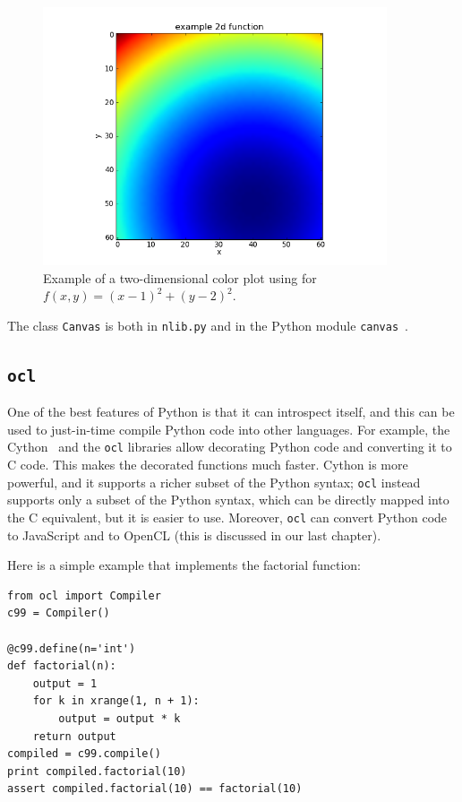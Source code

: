 \documentclass[justified,sixbynine]{tufte-book}
\def\ft{\small\tt}
\theoremstyle{plain}%
\theoremstyle{definition}
\theoremstyle{remark}
\begin{document}
\begin{fullwidth}
\begin{figure}[ht]
\centering\includegraphics[width=4in]{images/color2d.png}
\caption{Example of a two-dimensional color plot using for $f(x,y)=(x-1)^2+(y-2)^2$.}
\end{figure}

The class {\ft Canvas} is both in {\ft nlib.py} and in the Python module {\ft canvas}~\cite{canvas}.

\subsection{{\ft ocl}}

One of the best features of Python is that it can introspect itself, and this can be used to just-in-time compile Python code into other languages. For example, the Cython~\cite{cython} and the {\ft ocl} libraries allow decorating Python code and converting it to C code. This makes the decorated functions much faster. Cython is more powerful, and it supports a richer subset of the Python syntax; {\ft ocl} instead supports only a subset of the Python syntax, which can be directly mapped into the C equivalent, but it is easier to use. Moreover, {\ft ocl} can convert Python code to JavaScript and to OpenCL (this is discussed in our last chapter).

Here is a simple example that implements the factorial function:

\begin{lstlisting}
from ocl import Compiler
c99 = Compiler()

@c99.define(n='int')
def factorial(n):
    output = 1
    for k in xrange(1, n + 1):
        output = output * k
    return output
compiled = c99.compile()
print compiled.factorial(10)
assert compiled.factorial(10) == factorial(10)
\end{lstlisting}


\end{fullwidth}
\end{document}

